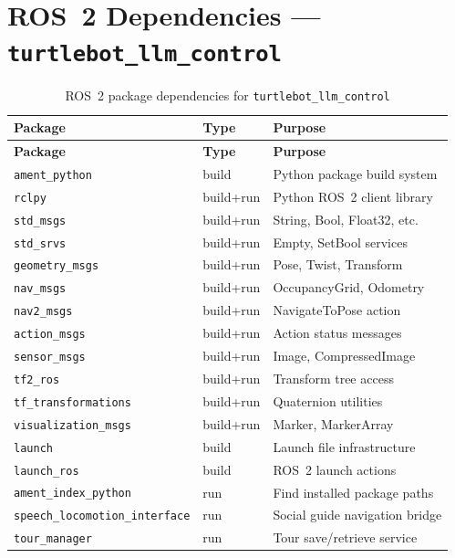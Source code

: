 \documentclass[12pt,a4paper]{report}
\begin{document}
\section{ROS~2 Dependencies — \texttt{turtlebot\_llm\_control}}

\begin{longtable}{L{5cm} L{3.5cm} L{5cm}}
  \caption{ROS~2 package dependencies for \texttt{turtlebot\_llm\_control}} \\
  \toprule
  \textbf{Package} & \textbf{Type} & \textbf{Purpose} \\
  \midrule
  \endfirsthead
  \toprule
  \textbf{Package} & \textbf{Type} & \textbf{Purpose} \\
  \midrule
  \endhead
  \bottomrule
  \endfoot
  \texttt{ament\_python}        & build     & Python package build system \\
  \texttt{rclpy}                & build+run & Python ROS~2 client library \\
  \texttt{std\_msgs}            & build+run & String, Bool, Float32, etc. \\
  \texttt{std\_srvs}            & build+run & Empty, SetBool services \\
  \texttt{geometry\_msgs}       & build+run & Pose, Twist, Transform \\
  \texttt{nav\_msgs}            & build+run & OccupancyGrid, Odometry \\
  \texttt{nav2\_msgs}           & build+run & NavigateToPose action \\
  \texttt{action\_msgs}         & build+run & Action status messages \\
  \texttt{sensor\_msgs}         & build+run & Image, CompressedImage \\
  \texttt{tf2\_ros}             & build+run & Transform tree access \\
  \texttt{tf\_transformations}  & build+run & Quaternion utilities \\
  \texttt{visualization\_msgs}  & build+run & Marker, MarkerArray \\
  \texttt{launch}               & build     & Launch file infrastructure \\
  \texttt{launch\_ros}          & build     & ROS~2 launch actions \\
  \texttt{ament\_index\_python} & run       & Find installed package paths \\
  \texttt{speech\_locomotion\_interface} & run & Social guide navigation bridge \\
  \texttt{tour\_manager}        & run       & Tour save/retrieve service \\
\end{longtable}
\end{document}

